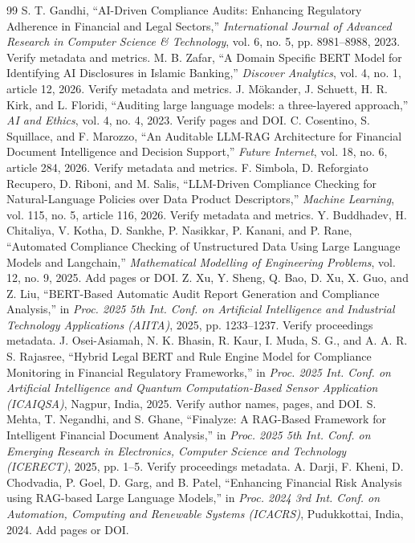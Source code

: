 \documentclass[conference]{IEEEtran}
\begin{document}
\begin{thebibliography}{99}
 S. T. Gandhi, ``AI-Driven Compliance Audits: Enhancing Regulatory Adherence in Financial and Legal Sectors,'' \emph{International Journal of Advanced Research in Computer Science \& Technology}, vol. 6, no. 5, pp. 8981--8988, 2023. Verify metadata and metrics.
 M. B. Zafar, ``A Domain Specific BERT Model for Identifying AI Disclosures in Islamic Banking,'' \emph{Discover Analytics}, vol. 4, no. 1, article 12, 2026. Verify metadata and metrics.
 J. Mökander, J. Schuett, H. R. Kirk, and L. Floridi, ``Auditing large language models: a three-layered approach,'' \emph{AI and Ethics}, vol. 4, no. 4, 2023. Verify pages and DOI.
 C. Cosentino, S. Squillace, and F. Marozzo, ``An Auditable LLM-RAG Architecture for Financial Document Intelligence and Decision Support,'' \emph{Future Internet}, vol. 18, no. 6, article 284, 2026. Verify metadata and metrics.
 F. Simbola, D. Reforgiato Recupero, D. Riboni, and M. Salis, ``LLM-Driven Compliance Checking for Natural-Language Policies over Data Product Descriptors,'' \emph{Machine Learning}, vol. 115, no. 5, article 116, 2026. Verify metadata and metrics.
 Y. Buddhadev, H. Chitaliya, V. Kotha, D. Sankhe, P. Nasikkar, P. Kanani, and P. Rane, ``Automated Compliance Checking of Unstructured Data Using Large Language Models and Langchain,'' \emph{Mathematical Modelling of Engineering Problems}, vol. 12, no. 9, 2025. Add pages or DOI.
 Z. Xu, Y. Sheng, Q. Bao, D. Xu, X. Guo, and Z. Liu, ``BERT-Based Automatic Audit Report Generation and Compliance Analysis,'' in \emph{Proc. 2025 5th Int. Conf. on Artificial Intelligence and Industrial Technology Applications (AIITA)}, 2025, pp. 1233--1237. Verify proceedings metadata.
 J. Osei-Asiamah, N. K. Bhasin, R. Kaur, I. Muda, S. G., and A. A. R. S. Rajasree, ``Hybrid Legal BERT and Rule Engine Model for Compliance Monitoring in Financial Regulatory Frameworks,'' in \emph{Proc. 2025 Int. Conf. on Artificial Intelligence and Quantum Computation-Based Sensor Application (ICAIQSA)}, Nagpur, India, 2025. Verify author names, pages, and DOI.
 S. Mehta, T. Negandhi, and S. Ghane, ``Finalyze: A RAG-Based Framework for Intelligent Financial Document Analysis,'' in \emph{Proc. 2025 5th Int. Conf. on Emerging Research in Electronics, Computer Science and Technology (ICERECT)}, 2025, pp. 1--5. Verify proceedings metadata.
 A. Darji, F. Kheni, D. Chodvadia, P. Goel, D. Garg, and B. Patel, ``Enhancing Financial Risk Analysis using RAG-based Large Language Models,'' in \emph{Proc. 2024 3rd Int. Conf. on Automation, Computing and Renewable Systems (ICACRS)}, Pudukkottai, India, 2024. Add pages or DOI.

\end{thebibliography}
\end{document}
